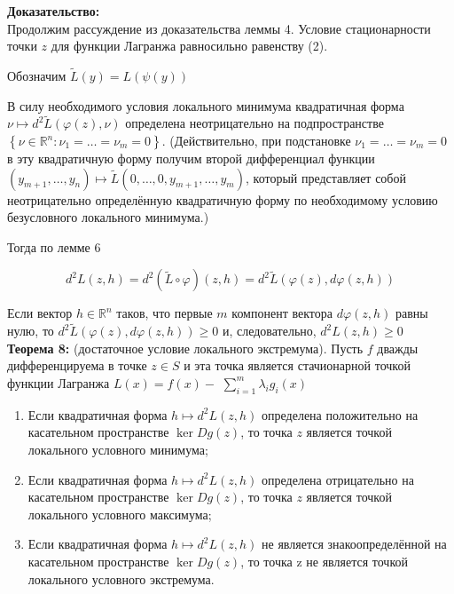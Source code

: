 \documentclass[a4paper,12pt]{article} %
\begin{document}
\textbf{Доказательство:}\\
Продолжим рассуждение из доказательства леммы 4. Условие стационарности точки $z$ для функции Лагранжа равносильно равенству (2).

Обозначим $\tilde{L}(y)=L(\psi(y))$

В силу необходимого условия локального минимума квадратичная форма $\nu \mapsto d^{2} \tilde{L}(\varphi(z), \nu)$ определена неотрицательно на подпространстве $\left\{\nu \in \mathbb{R}^{n}: \nu_{1}=\ldots=\nu_{m}=0\right\}$. (Действительно, при подстановке $\nu_{1}=\ldots=\nu_{m}=0$ в эту квадратичную форму получим второй дифференциал функции $\left(y_{m+1}, \ldots, y_{n}\right) \mapsto \tilde{L}\left(0, \ldots, 0, y_{m+1}, \ldots, y_{m}\right)$, который представляет собой неотрицательно определённую квадратичную форму по необходимому условию безусловного локального минимума.)

Тогда по лемме 6

$$
d^{2} L(z, h)=d^{2}(\tilde{L} \circ \varphi)(z, h)=d^{2} \tilde{L}(\varphi(z), d \varphi(z, h))
$$

Если вектор $h \in \mathbb{R}^{n}$ таков, что первые $m$ компонент вектора $d \varphi(z, h)$ равны нулю, то $d^{2} \tilde{L}(\varphi(z), d \varphi(z, h)) \geq 0$ и, следовательно, $d^{2} L(z, h) \geq 0$\\
 \textbf{Теорема 8:} (достаточное условие локального экстремума). Пусть $f$ дважды дифференцируема в точке $z \in S$ и эта точка является стачионарной точкой функции Лагранжа $L(x)=f(x)-$ $\sum_{i=1}^{m} \lambda_{i} g_{i}(x)$

\begin{enumerate}
\item Если квадратичная форма $h \mapsto d^{2} L(z, h)$ определена положительно на касательном пространстве $\operatorname{ker} D g(z)$, то точка $z$ является точкой локального условного минимума;

\item Если квадратичная форма $h \mapsto d^{2} L(z, h)$ определена отрицательно на касательном пространстве $\operatorname{ker} D g(z)$, то точка $z$ является точкой локального условного максимума;

\item Если квадратичная форма $h \mapsto d^{2} L(z, h)$ не является знакоопределённой на касательном пространстве $\operatorname{ker} D g(z)$, то точка z не является точкой локального условного экстремума.

\end{enumerate}
\end{document}
